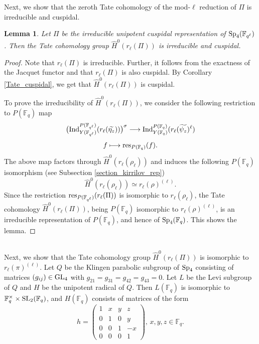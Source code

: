 \documentclass[10pt, reqno]{amsart}
\theoremstyle{plain}
\numberwithin{equation}{section} \newcommand{\di}{\operatorname{dim}}
\newtheorem{lemma}[theorem]{Lemma}
\begin{document}
\subsubsection{}
Next, we show that the zeroth
Tate cohomology of the mod-$\ell$ reduction of $\Pi$ 
is irreducible and cuspidal.
\begin{lemma}\label{irr_Sp4}
Let $\Pi$ be the irreducible unipotent cuspidal representation of
${\rm Sp}_4(\mathbb{F}_{q^\ell})$. Then the Tate cohomology
group $\widehat{H}^0(r_\ell(\Pi))$ is irreducible and cuspidal.
\end{lemma}
\begin{proof}
  Note that $r_\ell(\Pi)$ is irreducible.  Further, it follows from
  the exactness of the Jacquet functor and \cite[Chapter I, Section
  9.3]{Vigneras_modl_book} that $r_\ell(\Pi)$ is also cuspidal. By
  Corollary \ref{Tate_cuspidal}, we get that
  $\widehat{H}^0(r_\ell(\Pi))$ is cuspidal.

To prove the irreducibility of $\widehat{H}^0(r_\ell(\Pi))$, we
consider the following restriction to $P(\mathbb{F}_q)$ map
$$ \big({\rm Ind}_{Y(\mathbb{F}_{q^\ell})}
^{P(\mathbb{F}_{q^\ell})}
(r_\ell(\widetilde{\eta_z}))\big)^\sigma \longrightarrow
{\rm Ind}_{Y(\mathbb{F}_{q})}^{P(\mathbb{F}_{q})}
(r_\ell(\widetilde{\psi_z})^\ell) $$ 
$$ f \longmapsto {\rm res}_{P(\mathbb{F}_q)}(f). $$
The above map factors through $\widehat{H}^0(r_\ell(\rho_\ell))$ and
induces the following $P(\mathbb{F}_q)$ isomorphism (see Subsection
\ref{section_kirrilov_rep})
$$ \widehat{H}^0(r_\ell(\rho_\ell)) 
\simeq r_\ell(\rho)^{(\ell)}. $$ Since the restriction
${\rm res}_{P(\mathbb{F}_{q^\ell})}(r_\ell(\Pi))$ is isomorphic to
$r_\ell(\rho_\ell)$, the Tate cohomology
$\widehat{H}^0(r_\ell(\Pi))$, being $P(\mathbb{F}_q)$ isomorphic to
$r_\ell(\rho)^{(\ell)}$, is an irreducible representation of
$P(\mathbb{F}_q)$, and hence of ${\rm Sp}_4(\mathbb{F}_q)$.  This
shows the lemma.
\end{proof}
\subsection{}
Next, we show that the Tate cohomology group
$\widehat{H}^0(r_\ell(\Pi))$ is isomorphic to
$r_\ell(\pi)^{(\ell)}$. Let $Q$ be the Klingen parabolic subgroup of
${\rm Sp}_4$ consisting of matrices $(g_{ij})\in {\rm GL}_4$ with
$g_{21}=g_{31}=g_{42}=g_{43}=0$.  Let $L$ be the Levi subgroup of $Q$
and $H$ be the unipotent radical of $Q$.  Then $L(\mathbb{F}_q)$ is
isomorphic to $\mathbb{F}_q^\times \times {\rm SL}_2(\mathbb{F}_q)$,
and $H(\mathbb{F}_q)$ consists of matrices of the form
$$ h=
\begin{pmatrix}
1 & x & y & z\\
0 & 1 & 0 & y\\
0 & 0 & 1 & -x\\
0 & 0 & 0 & 1
\end{pmatrix},\, x,y,z\in\mathbb{F}_q. $$
\end{document}
